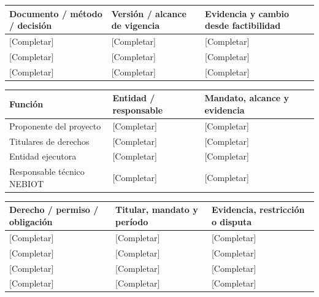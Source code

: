 {\sffamily\fontsize{8.3}{10.3}\selectfont\begin{longtable}{@{}P{56.09mm} P{46.19mm} P{62.69mm}@{}}
\toprule
\textbf{Documento / método / decisión} & \textbf{Versión / alcance de vigencia} & \textbf{Evidencia y cambio desde factibilidad}\\\midrule\endhead
\rule{0pt}{7.7mm}[Completar] & [Completar] & [Completar]\\\hline
\rule{0pt}{7.7mm}[Completar] & [Completar] & [Completar]\\\hline
\rule{0pt}{7.7mm}[Completar] & [Completar] & [Completar]\\\hline
\end{longtable}}
{\sffamily\fontsize{8.3}{10.3}\selectfont\begin{longtable}{@{}P{41.24mm} P{46.19mm} P{77.54mm}@{}}
\toprule
\textbf{Función} & \textbf{Entidad / responsable} & \textbf{Mandato, alcance y evidencia}\\\midrule\endhead
\rule{0pt}{7.7mm}Proponente del proyecto & [Completar] & [Completar]\\\hline
\rule{0pt}{7.7mm}Titulares de derechos & [Completar] & [Completar]\\\hline
\rule{0pt}{7.7mm}Entidad ejecutora & [Completar] & [Completar]\\\hline
\rule{0pt}{7.7mm}Responsable técnico NEBIOT & [Completar] & [Completar]\\\hline
\end{longtable}}
{\sffamily\fontsize{8.3}{10.3}\selectfont\begin{longtable}{@{}P{52.79mm} P{56.09mm} P{56.09mm}@{}}
\toprule
\textbf{Derecho / permiso / obligación} & \textbf{Titular, mandato y período} & \textbf{Evidencia, restricción o disputa}\\\midrule\endhead
\rule{0pt}{7.7mm}[Completar] & [Completar] & [Completar]\\\hline
\rule{0pt}{7.7mm}[Completar] & [Completar] & [Completar]\\\hline
\rule{0pt}{7.7mm}[Completar] & [Completar] & [Completar]\\\hline
\rule{0pt}{7.7mm}[Completar] & [Completar] & [Completar]\\\hline
\end{longtable}}
